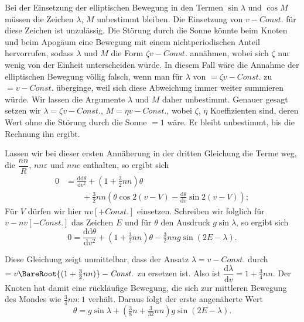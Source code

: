 \par\noindent\hspace*{\parindent}Bei der Einsetzung der elliptischen Bewegung
in den Termen \(\sin\lambda\) und \(\cos M\) müssen die Zeichen \(\lambda\), \(M\)
unbestimmt bleiben. Die Einsetzung von \(v-\mathit{Const.}\)
für diese Zeichen ist unzulässig. Die Störung durch die Sonne könnte
beim Knoten und beim Apogäum eine Bewegung mit einem nichtperiodischen Anteil hervorrufen,
sodass \(\lambda\) und \(M\) die Form \(\zeta v-\mathit{Const.}\) annähmen,
wobei sich \(\zeta\) nur wenig von der Einheit unterscheiden würde.
In diesem Fall wäre die Annahme der elliptischen Bewegung völlig falsch,
wenn man für \(\lambda\) von \(=\zeta v-\mathit{Const.}\) zu \(=v-\mathit{Const.}\) überginge,
weil sich diese Abweichung immer weiter summieren würde.
Wir lassen die Argumente \(\lambda\) und \(M\) daher unbestimmt. Genauer gesagt
setzen wir \(\lambda=\zeta v-\mathit{Const.}\), \(M=\eta v-\mathit{Const.}\),
wobei \(\zeta\), \(\eta\) Koeffizienten sind, deren Wert ohne die Störung
durch die Sonne \(=1\) wäre. Er bleibt unbestimmt,
bis die Rechnung ihn ergibt.

\par\noindent\hspace*{\parindent}Lassen wir bei dieser ersten Annäherung in der dritten Gleichung die
Terme weg, die \(\dfrac{nn}{R}\), \(nn\varepsilon\) und \(nne\) enthalten,
so ergibt sich
\[
\begin{aligned}
0&=\frac{\mathrm{dd}\theta}{\mathrm{d}v^2}+(1+\tfrac32nn)\theta\\
&\qquad+\tfrac32nn\left(\theta\cos2(v-V)
-\frac{\mathrm{d}\theta}{\mathrm{d}v}\sin2(v-V)\right);
\end{aligned}
\]
\noindent Für \(V\) dürfen wir hier \(nv[+\mathit{Const.}]\) einsetzen.
Schreiben wir folglich für \(v-nv[-\mathit{Const.}]\) das Zeichen \(E\) und für
\(\theta\) den Ausdruck \(g\sin\lambda\), so ergibt sich
\[
0=\frac{\mathrm{dd}\theta}{\mathrm{d}v^2}+(1+\tfrac32nn)\theta
-\tfrac32nng\sin(2E-\lambda).
\]

\par\noindent\hspace*{\parindent}Diese Gleichung zeigt unmittelbar, dass der Ansatz
\(\lambda=v-\mathit{Const.}\) durch
\(=v\BareRoot{(1+\tfrac32nn)}-\mathit{Const.}\) zu ersetzen ist.
Also ist \(\dfrac{\mathrm{d}\lambda}{\mathrm{d}v}=1+\tfrac34nn\). Der
Knoten hat damit eine rückläufige Bewegung, die sich zur mittleren Bewegung
des Mondes wie \(\tfrac34nn:1\) verhält. Daraus folgt der erste angenäherte
Wert
\[
\theta=g\sin\lambda+(\tfrac38n+\tfrac{3}{32}nn)g\sin(2E-\lambda).
\]

